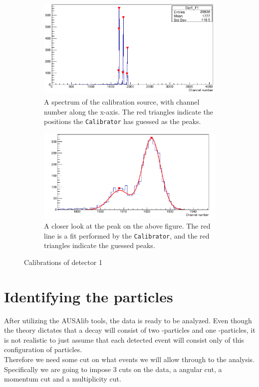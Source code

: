 \begin{figure}[H]
	\begin{subfigure}{\linewidth}
		\centering
		\includegraphics[width=.9\linewidth]{../figures/cali/det1f1-cropped.pdf}
		\caption{A spectrum of the calibration source, with channel number along the x-axis. The red triangles indicate the positions the \texttt{Calibrator} has guessed as the peaks.}
		\label{fig:singleStripExample}
	\end{subfigure}
	\begin{subfigure}{\textwidth}
		\centering
		\includegraphics[width=.9\linewidth]{../figures/cali/det1f1PeakMostLeft-cropped}
		\caption{A closer look at the  peak on the above figure. The red line is a fit performed by the \texttt{Calibrator}, and the red triangles indicate the guessed peaks. }
		\label{fig:peakExample}
	\end{subfigure}
	\caption{Calibrations of detector 1}
	\label{fig:CaliExamples}
\end{figure}


\section{Identifying the particles}
After utilizing the AUSAlib tools, the data is ready to be analyzed. Even though the theory dictates that a decay will consist of two \al-particles and one \be-particles, it is not realistic to just assume that each detected event will consist only of this configuration of particles. \\
Therefore we need some cut on what events we will allow through to the analysis. Specifically we are going to impose 3 cuts on the data, a angular cut, a momentum cut and a multiplicity cut.



